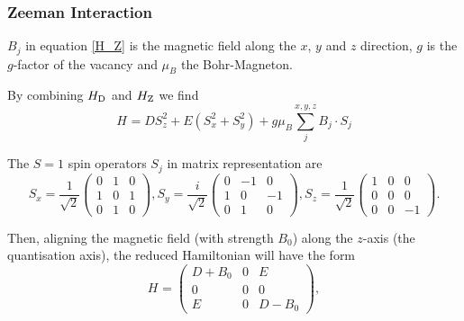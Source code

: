 \subsubsection{Zeeman Interaction}

$B_j$ in equation \ref{H_Z} is the magnetic field along the $x$, $y$ and $z$ direction, $g$ is the $g$-factor of the vacancy and $\mu_B$ the Bohr-Magneton. 


By combining $H_{\ce{D}}$ and $H_{\ce{Z}}$ 
we find 
\begin{equation}
    H_{} = D S_z^2 + E(S_x^2 + S_y^2) + g \mu_B \sum_{j}^{x,y,z} B_j \cdot S_j 
    \label{eq:reduced_H_NV}
\end{equation}

The $S=1$ spin operators $S_j$ in matrix representation are 
\begin{equation}
    S_x = \frac{1}{\sqrt{2}} \begin{pmatrix}
        0 & 1 & 0 \\ 
        1 & 0 & 1 \\ 
        0 & 1 & 0
    \end{pmatrix}, 
    S_y = \frac{i}{\sqrt{2}} \begin{pmatrix}
        0 & -1 & 0 \\ 
        1 & 0 & -1 \\ 
        0 & 1 & 0
    \end{pmatrix}, 
    S_z = \frac{1}{\sqrt{2}} \begin{pmatrix}
        1 & 0 & 0 \\ 
        0 & 0 & 0 \\ 
        0 & 0 & -1
    \end{pmatrix}. 
    \label{eq:spin_operators}
\end{equation}

Then, aligning the magnetic field (with strength $B_0$) along the $z$-axis (the quantisation axis), the reduced Hamiltonian will have the form 
\begin{equation}
    H_{} = \begin{pmatrix}
        D + B_0 & 0 & E \\ 
        0 & 0 & 0 \\ 
        E & 0 & D-B_0
    \end{pmatrix},
    \label{eq:reduced_H_NV_matrix}
\end{equation}

